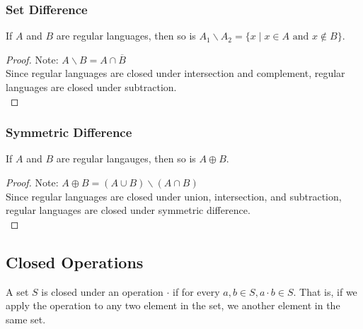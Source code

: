\documentclass[11pt,a4paper]{article}
\begin{document}
\subsubsection{Set Difference}
\begin{theorem}
    If $A$ and $B$ are regular languages, then so is $A_1 \backslash A_2=\{x \mid x\in A\text{ and } x\notin B\}$.

    \begin{proof}
        Note: $A\backslash B=A\cap\overline{B}$ \\

        Since regular languages are closed under intersection and complement, regular languages are closed under subtraction. \\
    \end{proof}
\end{theorem}

\subsubsection{Symmetric Difference}
\begin{theorem}
    If $A$ and $B$ are regular langauges, then so is $A\oplus B$.

    \begin{proof}
        Note: $A\oplus B=(A\cup B)\backslash(A\cap B)$ \\

        Since regular languages are closed under union, intersection, and subtraction, regular languages are closed under symmetric difference. \\
    \end{proof}
\end{theorem}

\subsection{Closed Operations}
A set $S$ is closed under an operation $\cdot$ if for every $a,b\in S,a\cdot b\in S$.
That is, if we apply the operation to any two element in the set, we another element in the same set.
\end{document}
